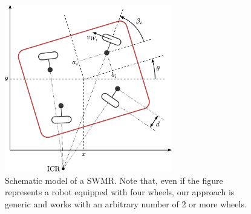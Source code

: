 \begin{figure}
    \centering
    \includegraphics[width=0.65\textwidth]{figures/SWMR/swmr.pdf}
    \caption{Schematic model of a SWMR. Note that, even if the figure
        represents a robot equipped with four wheels, our approach is generic
        and works with an arbitrary number of 2 or more wheels.}
    \label{fig:swmr}
\end{figure}

